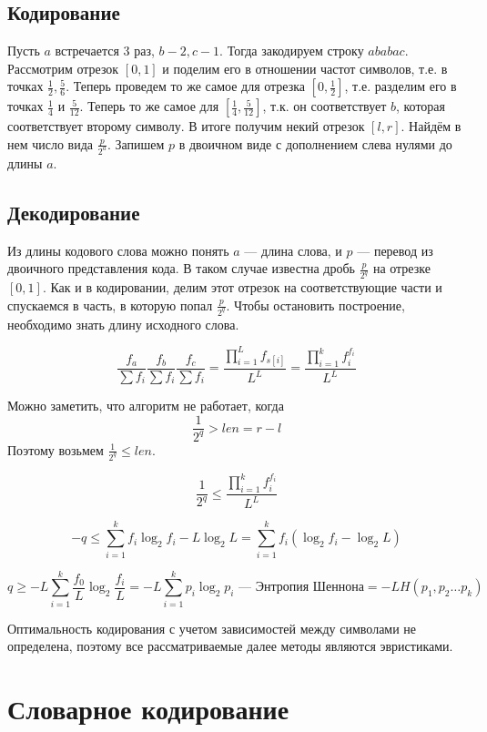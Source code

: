 \subsection{Кодирование}

Пусть $a$ встречается $3$ раз, $b - 2, c - 1$. Тогда закодируем строку $ababac$. Рассмотрим отрезок $[0, 1]$ и поделим его в отношении частот символов, т.е. в точках $\frac{1}{2}, \frac{5}{6}$. Теперь проведем то же самое для отрезка $[0, \frac{1}{2}]$, т.е. разделим его в точках $\frac{1}{4}$ и $\frac{5}{12}$. Теперь то же самое для $[\frac{1}{4}, \frac{5}{12}]$, т.к. он соответствует $b$, которая соответствует второму символу. В итоге получим некий отрезок $[l, r]$. Найдём в нем число вида $\frac{p}{2^a}$. Запишем $p$ в двоичном виде с дополнением слева нулями до длины $a$.

\subsection{Декодирование}

Из длины кодового слова можно понять $a$ --- длина слова, и $p$ --- перевод из двоичного представления кода. В таком случае известна дробь $\frac{p}{2^q}$ на отрезке $[0, 1]$. Как и в кодировании, делим этот отрезок на соответствующие части и спускаемся в часть, в которую попал $\frac{p}{2^q}$. Чтобы остановить построение, необходимо знать длину исходного слова.

$$\frac{f_a}{\sum f_i}\frac{f_b}{\sum f_i}\frac{f_c}{\sum f_i}=\frac{\prod\limits_{i=1}^L f_{s[i]}}{L^L} = \frac{\prod\limits_{i=1}^k f_i^{f_i}}{L^L}$$

Можно заметить, что алгоритм не работает, когда $$\frac{1}{2^q}>len=r-l$$
Поэтому возьмем $\frac{1}{2^q}\leq len$.

$$\frac{1}{2^q}\leq\frac{\prod\limits_{i=1}^k f_i^{f_i}}{L^L}$$

$$-q\leq \sum\limits_{i=1}^k f_i\log_2f_i-L\log_2 L=\sum\limits_{i=1}^k f_i(\log_2 f_i-\log_2L)$$

$$q\geq -L\sum\limits_{i=1}^k\frac{f_0}{L}\log_2\frac{f_i}{L}=-L\boxed{\sum\limits_{i=1}^k p_i\log_2 p_i} \text{ --- Энтропия Шеннона} =-LH(p_1,p_2\ldots p_k)$$

Оптимальность кодирования с учетом зависимостей между символами не определена, поэтому все рассматриваемые далее методы являются эвристиками.

\section{Словарное кодирование}

